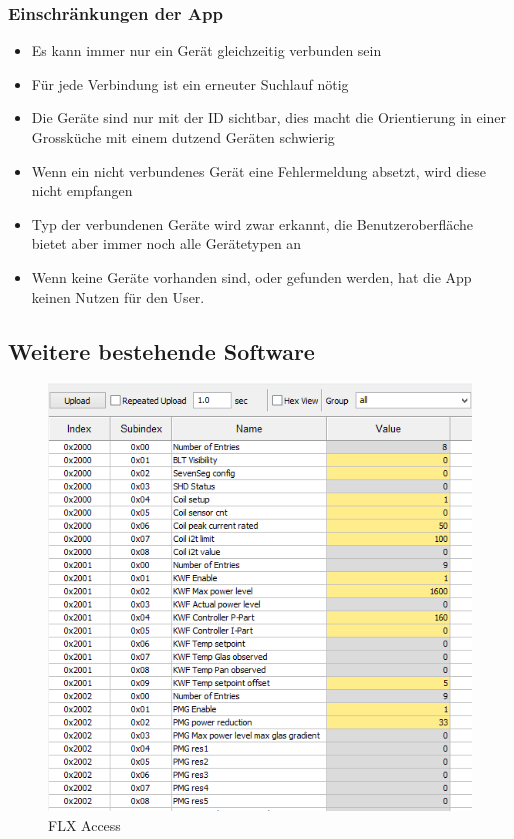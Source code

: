 \subsubsection{Einschränkungen der App}
\label{subsubsec:Einschränkungen der App}
\begin{itemize}
\item Es kann immer nur ein Gerät gleichzeitig verbunden sein
\item Für jede Verbindung ist ein erneuter Suchlauf nötig
\item Die Geräte sind nur mit der ID sichtbar, dies macht die Orientierung in einer Grossküche mit einem dutzend Geräten schwierig
\item Wenn ein nicht verbundenes Gerät eine Fehlermeldung absetzt, wird diese nicht empfangen
\item Typ der verbundenen Geräte wird zwar erkannt, die Benutzeroberfläche bietet aber immer noch alle Gerätetypen an
\item Wenn keine Geräte vorhanden sind, oder gefunden werden, hat die App keinen Nutzen für den User.
\end{itemize}

\WFclear
\subsection{Weitere bestehende Software}
\label{subsec:Weitere bestehende Software}

\begin{figure}
\includegraphics[scale=0.4]{analysis/res/flxaccess}
	\caption{FLX Access}
\end{figure}

